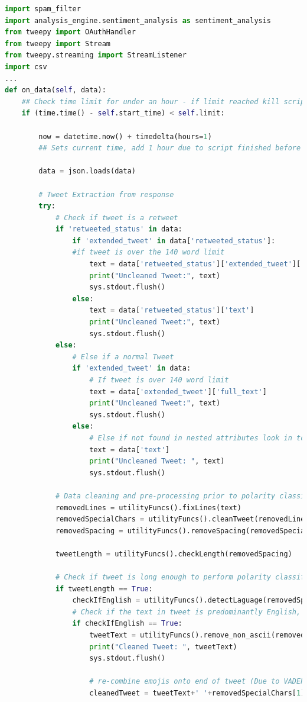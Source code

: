 \documentclass[oneside, 12pt]{article}
\begin{document}
			\begin{lstlisting}[language=python, caption=Tweepy Stream: 'on\_data' method]
import spam_filter
import analysis_engine.sentiment_analysis as sentiment_analysis
from tweepy import OAuthHandler
from tweepy import Stream
from tweepy.streaming import StreamListener
import csv
...	
def on_data(self, data):
	## Check time limit for under an hour - if limit reached kill script
	if (time.time() - self.start_time) < self.limit:
			
		now = datetime.now() + timedelta(hours=1)
		## Sets current time, add 1 hour due to script finished before the completed hour is finished
			
		data = json.loads(data)
					
		# Tweet Extraction from response
		try:
			# Check if tweet is a retweet
			if 'retweeted_status' in data:
				if 'extended_tweet' in data['retweeted_status']:
				#if tweet is over the 140 word limit
					text = data['retweeted_status']['extended_tweet']['full_text']
					print("Uncleaned Tweet:", text)
					sys.stdout.flush()
				else:
					text = data['retweeted_status']['text']
					print("Uncleaned Tweet:", text)
					sys.stdout.flush()
			else:
				# Else if a normal Tweet
				if 'extended_tweet' in data:
					# If tweet is over 140 word limit
					text = data['extended_tweet']['full_text']
					print("Uncleaned Tweet:", text)
					sys.stdout.flush()
				else:
					# Else if not found in nested attributes look in top-level
					text = data['text']
					print("Uncleaned Tweet: ", text)
					sys.stdout.flush()
			
			# Data cleaning and pre-processing prior to polarity classification
			removedLines = utilityFuncs().fixLines(text)
			removedSpecialChars = utilityFuncs().cleanTweet(removedLines)
			removedSpacing = utilityFuncs().removeSpacing(removedSpecialChars[0])
			
			tweetLength = utilityFuncs().checkLength(removedSpacing)
						
			# Check if tweet is long enough to perform polarity classification on (> 5 words (checked through tokenisation))
			if tweetLength == True:
				checkIfEnglish = utilityFuncs().detectLaguage(removedSpecialChars[0])
				# Check if the text in tweet is predominantly English, if not drop
				if checkIfEnglish == True:
					tweetText = utilityFuncs().remove_non_ascii(removedSpacing)
					print("Cleaned Tweet: ", tweetText)
					sys.stdout.flush()
								
					# re-combine emojis onto end of tweet (Due to VADER supporting emoticon sentiment assignment)
					cleanedTweet = tweetText+' '+removedSpecialChars[1]
			

\end{lstlisting}
\end{document}
